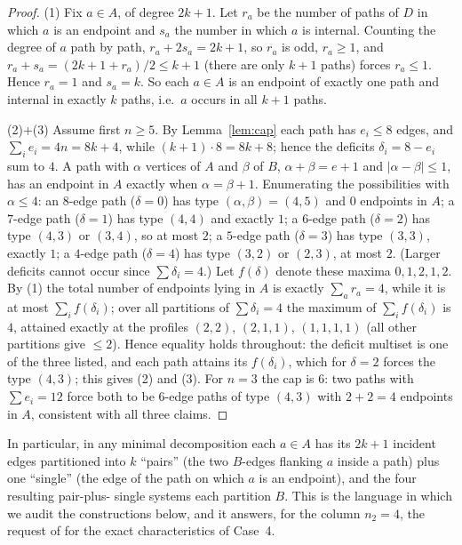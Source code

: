 \begin{proof}
(1) Fix $a\in A$, of degree $2k+1$. Let $r_a$ be the number of paths of $D$ in which $a$ is an
endpoint and $s_a$ the number in which $a$ is internal. Counting the degree of $a$ path by path,
$r_a+2s_a=2k+1$, so $r_a$ is odd, $r_a\ge1$, and
$r_a+s_a=(2k+1+r_a)/2\le k+1$ (there are only $k+1$ paths) forces $r_a\le1$. Hence $r_a=1$ and
$s_a=k$. So each $a\in A$ is an endpoint of exactly one path and internal in exactly $k$ paths,
i.e.\ $a$ occurs in all $k+1$ paths.

(2)+(3) Assume first $n\ge5$. By Lemma~\ref{lem:cap} each path has $e_i\le8$ edges, and
$\sum_ie_i=4n=8k+4$, while $(k+1)\cdot8=8k+8$; hence the deficits $\delta_i=8-e_i$ sum to
$4$. A path with $\alpha$ vertices of $A$ and $\beta$ of $B$, $\alpha+\beta=e+1$ and
$|\alpha-\beta|\le1$, has an endpoint in $A$ exactly when $\alpha=\beta+1$. Enumerating the
possibilities with $\alpha\le4$: an $8$-edge path ($\delta=0$) has type $(\alpha,\beta)=(4,5)$
and $0$ endpoints in $A$; a $7$-edge path ($\delta=1$) has type $(4,4)$ and exactly $1$; a
$6$-edge path ($\delta=2$) has type $(4,3)$ or $(3,4)$, so at most $2$; a $5$-edge path
($\delta=3$) has type $(3,3)$, exactly $1$; a $4$-edge path ($\delta=4$) has type $(3,2)$ or
$(2,3)$, at most $2$. (Larger deficits cannot occur since $\sum\delta_i=4$.) Let $f(\delta)$
denote these maxima $0,1,2,1,2$. By (1) the total number of endpoints lying in $A$ is exactly
$\sum_{a}r_a=4$, while it is at most $\sum_if(\delta_i)$; over all partitions of
$\sum\delta_i=4$ the maximum of $\sum_if(\delta_i)$ is $4$, attained exactly at the profiles
$(2,2)$, $(2,1,1)$, $(1,1,1,1)$ (all other partitions give $\le2$). Hence equality holds
throughout: the deficit multiset is one of the three listed, and each path attains its
$f(\delta_i)$, which for $\delta=2$ forces the type $(4,3)$; this gives (2) and (3). For $n=3$
the cap is $6$: two paths with $\sum e_i=12$ force both to be $6$-edge paths of type $(4,3)$
with $2+2=4$ endpoints in $A$, consistent with all three claims.
\end{proof}

In particular, in any minimal decomposition each $a\in A$ has its $2k+1$ incident edges
partitioned into $k$ ``pairs'' (the two $B$-edges flanking $a$ inside a path) plus one
``single'' (the edge of the path on which $a$ is an endpoint), and the four resulting pair-plus-
single systems each partition $B$. This is the language in which we audit the constructions
below, and it answers, for the column $n_2=4$, the request of \cite{CE18} for the exact
characteristics of Case~4.

